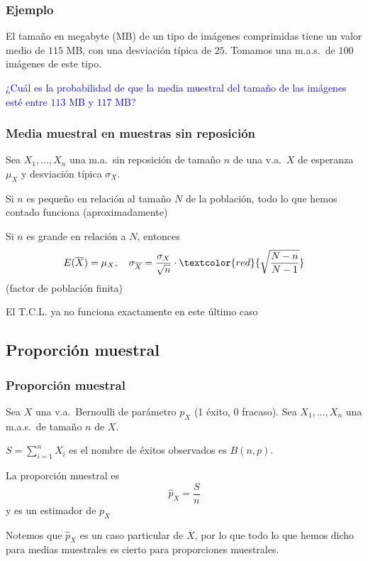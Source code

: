 \documentclass[12pt,t]{beamer}
\newcommand{\red}[1]{\textcolor{red}{#1}}
\newcommand{\blue}[1]{\textcolor{blue}{#1}}
\renewcommand{\emph}[1]{{\color{red}#1}}
\theoremstyle{plain}
\theoremstyle{definition}
\begin{document}
\begin{frame}
\vspace*{-2ex}

\frametitle{Ejemplo}

El tamaño en megabyte (MB)  de un  tipo de imágenes comprimidas tiene  un  valor medio de   $115$ MB, con una desviación típica de $25$. Tomamos  una m.a.s.\ de $100$ imágenes de este tipo.
\medskip

\blue{¿Cuál es la probabilidad de que la media muestral del tamaño de las imágenes esté entre $113$ MB y $117$ MB?}
\medskip


\end{frame}








\begin{frame}
\frametitle{Media muestral en muestras sin reposición}

Sea $X_1,\ldots, X_n$ una m.a.\ \emph{sin  reposición} de tamaño $n$ de una v.a.\ $X$ de esperanza $\mu_X$ y desviación típica $\sigma_X$. 
\medskip

Si $n$ es  pequeño en relación al tamaño $N$ de la población, todo lo que hemos contado funciona (aproximadamente)
\medskip

Si $n$ es grande en relación a $N$, entonces
$$
E(\overline{X})=\mu_X,\quad \sigma_{\overline{X}}=\frac{\sigma_X}{\sqrt{n}}\cdot\red{\sqrt{\frac{N-n}{N-1}}}
$$
(\emph{factor de población finita})
\medskip

El T.C.L. ya no funciona exactamente en este último caso
\end{frame}

\subsection{Proporción  muestral}
\begin{frame}
\frametitle{Proporción  muestral}

Sea $X$ una v.a.\ Bernoulli de parámetro  $p_X$ (1 éxito, 0 fracaso). Sea $X_1,\ldots,X_n$ una m.a.s.\ de tamaño $n$ de $X$. 
\medskip

$S=\sum_{i=1}^n X_i$ es el nombre de éxitos observados
es $B(n,p)$.
\medskip

La \emph{proporción muestral} es 
$$
\widehat{p}_X=\frac{S}{n}
$$
y es un estimador de $p_X$
\medskip

Notemos que $\widehat{p}_X$ es un caso particular de $\overline{X}$, por lo que todo lo que hemos dicho para medias muestrales es cierto para proporciones muestrales.

\end{frame}
\end{document}
